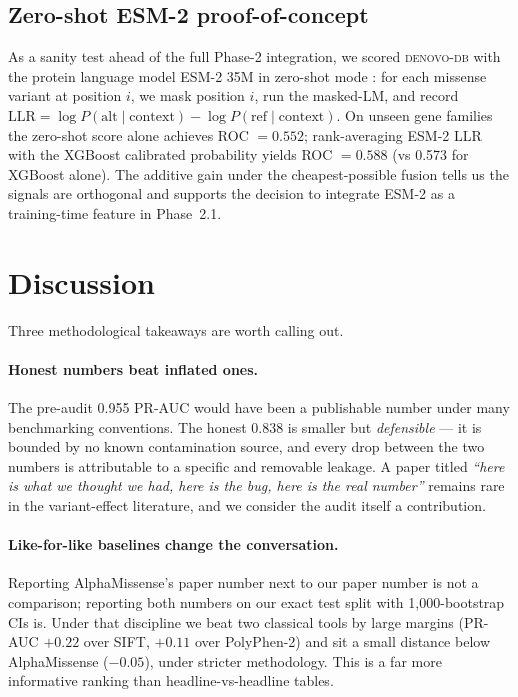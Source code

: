 \documentclass[11pt,a4paper]{article}
\begin{document}
\subsection{Zero-shot ESM-2 proof-of-concept}
\label{sec:results-esm2}

As a sanity test ahead of the full Phase-2 integration, we
scored \textsc{denovo-db} with the protein language model
ESM-2 35M \citep{lin2023esm2} in zero-shot mode
\citep{brandes2023esm1b}: for each missense variant at position
\(i\), we mask position \(i\), run the masked-LM, and record
\(\text{LLR} = \log P(\text{alt} \mid \text{context}) -
\log P(\text{ref} \mid \text{context})\). On unseen gene
families the zero-shot score alone achieves ROC \(= 0.552\);
rank-averaging ESM-2 LLR with the XGBoost calibrated
probability yields ROC \(= 0.588\) (vs 0.573 for XGBoost
alone). The additive gain under the cheapest-possible fusion
tells us the signals are orthogonal and supports the decision
to integrate ESM-2 as a training-time feature in Phase~2.1.

\section{Discussion}

Three methodological takeaways are worth calling out.

\paragraph{Honest numbers beat inflated ones.}
The pre-audit 0.955 PR-AUC would have been a publishable number
under many benchmarking conventions. The honest 0.838 is smaller
but \emph{defensible} --- it is bounded by no known contamination
source, and every drop between the two numbers is attributable to
a specific and removable leakage. A paper titled
\emph{``here is what we thought we had, here is the bug, here is
the real number''} remains rare in the variant-effect literature,
and we consider the audit itself a contribution.

\paragraph{Like-for-like baselines change the conversation.}
Reporting AlphaMissense's paper number next to our paper number
is not a comparison; reporting both numbers on our exact test
split with 1{,}000-bootstrap CIs is. Under that discipline we
beat two classical tools by large margins (PR-AUC \(+0.22\) over
SIFT, \(+0.11\) over PolyPhen-2) and sit a small distance below
AlphaMissense (\(-0.05\)), under stricter methodology. This is a
far more informative ranking than headline-vs-headline tables.
\end{document}

